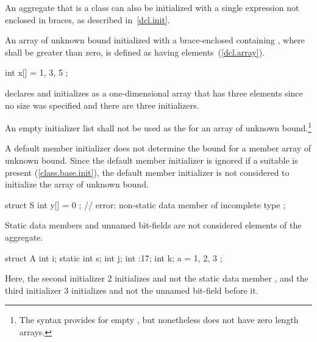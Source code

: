 \pnum
An aggregate that is a class can also be initialized with a single
expression not enclosed in braces, as described in~\ref{dcl.init}.

\pnum
An array of unknown bound initialized with a
brace-enclosed
containing
,
where
shall be greater than zero, is defined as having
elements~(\ref{dcl.array}).
\begin{example}

\begin{codeblock}
int x[] = { 1, 3, 5 };
\end{codeblock}

declares and initializes
as a one-dimensional array that has three elements
since no size was specified and there are three initializers.
\end{example}
An empty initializer list
\tcode{\{\}}
shall not be used as the 
for an array of unknown bound.\footnote{The syntax provides for empty
,
but nonetheless \Cpp does not have zero length arrays.}
\begin{note}
A default member initializer does not determine the bound for a member
array of unknown bound.  Since the default member initializer is
ignored if a suitable  is present
(\ref{class.base.init}), the default member initializer is not
considered to initialize the array of unknown bound.
\begin{example}
\begin{codeblock}
struct S {
  int y[] = { 0 };          // error: non-static data member of incomplete type
};
\end{codeblock}
\end{example}
\end{note}

\pnum
\begin{note}
Static data members and unnamed bit-fields are not considered
elements of the aggregate.
\begin{example}

\begin{codeblock}
struct A {
  int i;
  static int s;
  int j;
  int :17;
  int k;
} a = { 1, 2, 3 };
\end{codeblock}

Here, the second initializer 2 initializes
and not the static data member
, and the third initializer 3 initializes 
and not the unnamed bit-field before it.
\end{example}
\end{note}

